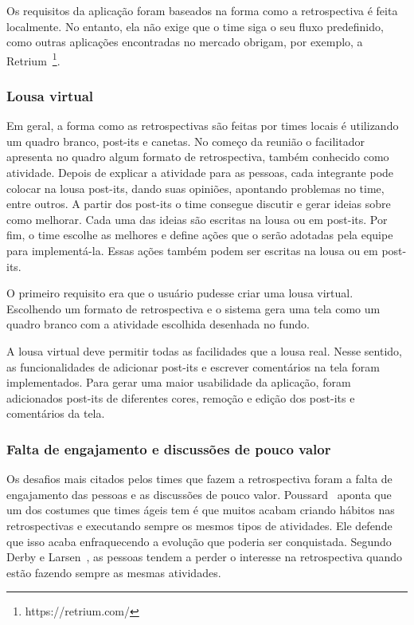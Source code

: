 Os requisitos da aplicação foram baseados na forma como a retrospectiva é feita localmente. No entanto, ela não exige que o time siga o seu fluxo predefinido, como outras aplicações encontradas no mercado obrigam, por exemplo, a Retrium~\footnote{https://retrium.com/}.

\subsubsection*{Lousa virtual}

Em geral, a forma como as retrospectivas são feitas por times locais é utilizando um quadro branco, post-its e canetas. No começo da reunião o facilitador apresenta no quadro algum formato de retrospectiva, também conhecido como atividade. Depois de explicar a atividade para as pessoas, cada integrante pode colocar na lousa post-its, dando suas opiniões, apontando problemas no time, entre outros. A partir dos post-its o time consegue discutir e gerar ideias sobre como melhorar. Cada uma das ideias são escritas na lousa ou em post-its. Por fim, o time escolhe as melhores e define ações que o serão adotadas pela equipe para implementá-la. Essas ações também podem ser escritas na lousa ou em post-its.

O primeiro requisito era que o usuário pudesse criar uma lousa virtual. Escolhendo um formato de retrospectiva e o sistema gera uma tela como um quadro branco com a atividade escolhida desenhada no fundo.

A lousa virtual deve permitir todas as facilidades que a lousa real. Nesse sentido, as funcionalidades de adicionar post-its e escrever comentários na tela foram implementados. Para gerar uma maior usabilidade da aplicação, foram adicionados post-its de diferentes cores, remoção e edição dos post-its e comentários da tela.

\subsubsection*{Falta de engajamento e discussões de pouco valor}

Os desafios mais citados pelos times que fazem a retrospectiva foram a falta de engajamento das pessoas e as discussões de pouco valor. Poussard~\cite{poussard} aponta que um dos costumes que times ágeis tem é que muitos acabam criando hábitos nas retrospectivas e executando sempre os mesmos tipos de atividades. Ele defende que isso acaba enfraquecendo a evolução que poderia ser conquistada. Segundo Derby e Larsen~\cite{retrospectives},  as pessoas tendem a perder o interesse na retrospectiva quando estão fazendo sempre as mesmas atividades.

